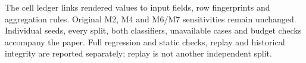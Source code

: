 The cell ledger  links rendered values to input fields, row fingerprints and aggregation rules. Original M2, M4 and M6/M7 sensitivities remain unchanged. Individual seeds, every split, both classifiers, unavailable cases and budget checks accompany the paper. Full regression and static checks, replay and historical integrity are reported separately; replay is not another independent split.
